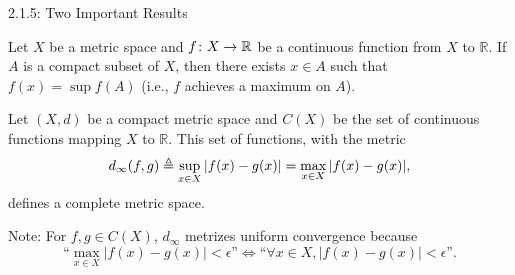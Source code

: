 \documentclass[10pt,english]{beamer}
\newcommand{\backupbegin}{
   \newcounter{finalframe}
   \setcounter{finalframe}{\value{framenumber}}
}
\newcommand{\backupend}{
   \setcounter{framenumber}{\value{finalframe}}
}
\begin{document}
\begin{frame}{2.1.5: Two Important Results}

\begin{theorem}
Let $X$ be a metric space and $f \colon X\rightarrow \mathbb{R}$ be a continuous function from $X$ to $\mathbb{R}$.
If $A$ is a compact subset of $X$, then there exists $x\in A$ such that $f(x)=\sup f(A)$ (i.e., $f$ achieves a maximum on $A$).
\end{theorem}

\vspace{3mm}

\begin{theorem}
Let $(X,d)$ be a compact metric space and $C(X)$ be the set of continuous functions mapping $X$ to $\mathbb{R}$.
This set of functions, with the metric \vspace{-1.5mm} \[d_\infty (f,g) \triangleq \sup_{x\in X} |f(x)-g(x)| = \max_{x\in X} |f(x)-g(x)|, \vspace*{-1.5mm}\] defines a complete metric space.
\end{theorem}

Note: For $f,g\in C(X)$, $d_\infty$ metrizes uniform convergence because \vspace{-1.5mm} \[ \text{``}\max_{x\in X} |f(x)-g(x)| < \epsilon \text{''} \Leftrightarrow \text{``} \forall x\in X, |f(x) - g(x)| < \epsilon \text{''}. \]

\end{frame}

\backupbegin


%
%

\backupend
\end{document}
